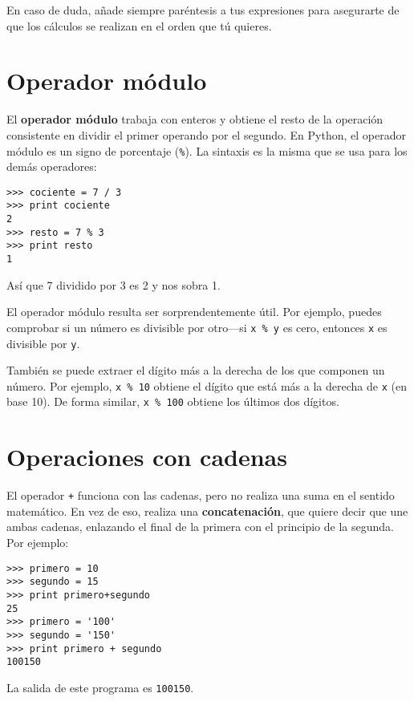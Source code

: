 En caso de duda, añade siempre paréntesis a tus expresiones para asegurarte
de que los cálculos se realizan en el orden que tú quieres.

\section{Operador módulo}


El {\bf operador módulo} trabaja con enteros y obtiene el resto
de la operación consistente en dividir el primer operando por el segundo. En Python, el
operador módulo es un signo de porcentaje (\verb"%"). La sintaxis es la misma
que se usa para los demás operadores:

\beforeverb
\begin{verbatim}
>>> cociente = 7 / 3
>>> print cociente
2
>>> resto = 7 % 3
>>> print resto
1
\end{verbatim}
\afterverb
%
Así que 7 dividido por 3 es 2 y nos sobra 1. 

El operador módulo resulta ser sorprendentemente útil. Por ejemplo,
puedes comprobar si un número es divisible por otro---si
{\tt x \% y} es cero, entonces {\tt x} es divisible por {\tt y}.


También se puede extraer el dígito más a la derecha
de los que componen un número. Por ejemplo, {\tt x \% 10} obtiene el
dígito que está más a la derecha de {\tt x} (en base 10). De forma similar, {\tt x \% 100}
obtiene los últimos dos dígitos.

\section{Operaciones con cadenas}

El operador {\tt +} funciona con las cadenas, pero
no realiza una suma en el sentido matemático. En vez de eso, realiza una
{\bf concatenación}, que quiere decir que une ambas cadenas,
enlazando el final de la primera con el principio de la segunda. Por ejemplo:


\beforeverb
\begin{verbatim}
>>> primero = 10
>>> segundo = 15
>>> print primero+segundo
25
>>> primero = '100'
>>> segundo = '150'
>>> print primero + segundo
100150
\end{verbatim}
\afterverb
%
La salida de este programa es {\tt 100150}.

